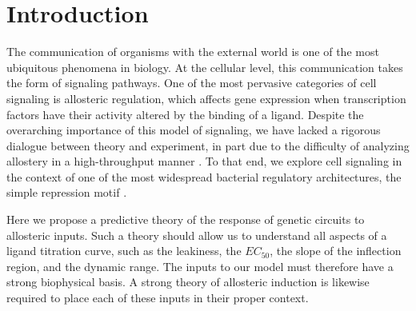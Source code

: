 \section*{Introduction}


The communication of organisms with the external world is one of the most ubiquitous phenomena in biology. At the cellular level, this communication takes the form of signaling pathways. One of the most pervasive categories of cell signaling is allosteric regulation, which affects gene expression when transcription factors have their activity altered by the binding of a ligand. Despite the overarching importance of this model of signaling, we have lacked a rigorous dialogue between theory and experiment, in part due to the difficulty of analyzing allostery in a high-throughput manner \cite{Lindsley2006}. To that end, we explore cell signaling in the context of one of the most widespread bacterial regulatory architectures, the simple repression motif \cite{Rydenfeldt2014}.


Here we propose a predictive theory of the response of genetic circuits to allosteric inputs. Such a theory should allow us to understand all aspects of a ligand titration curve, such as the leakiness, the $EC_{50}$, the slope of the inflection region, and the dynamic range. The inputs to our model must therefore have a strong biophysical basis. A strong theory of allosteric induction is likewise required to place each of these inputs in their proper context. 


